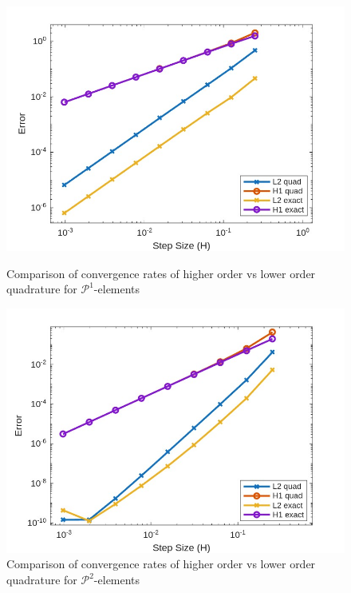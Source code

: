 \begin{figure}[h!]
    \begin{minipage}[t]{0.48\textwidth}
        \centering
        \includegraphics[width=\linewidth]{figures/dg_error_elliptic_with_and_without_quad_p1.jpg}
        \caption{Comparison of convergence rates of higher order vs lower order quadrature for $\mathcal{P}^1$-elements}
        \label{fig:elliptic_with_and_without_quad_conv_rates_p1}
    \end{minipage}
    \hfill
    \begin{minipage}[t]{0.48\textwidth}
        \centering
        \includegraphics[width=\linewidth]{figures/dg_error_elliptic_with_and_without_quad_p2.jpg}
        \caption{Comparison of convergence rates of higher order vs lower order quadrature for $\mathcal{P}^2$-elements}
        \label{fig:elliptic_with_and_without_quad_conv_rates_p2}
    \end{minipage}
\end{figure}

